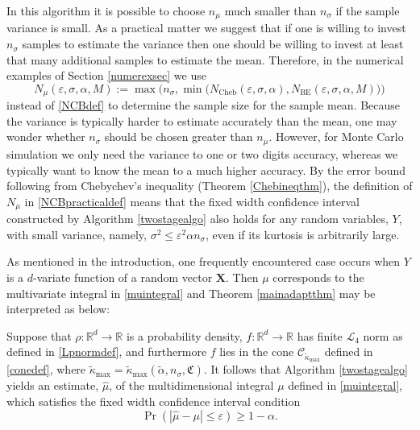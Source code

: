 \documentclass[graybox]{svmult}
\newcommand{\fudge}{\mathfrak{C}}
\newcommand\reals{\mathbb{R}}
\newcommand{\vX}{\boldsymbol{X}}
\newcommand{\tkappa}{\tilde{\kappa}}
\newcommand{\cc}{\mathcal{C}}
\newcommand{\cl}{\mathcal{L}}
\begin{document}
\begin{remark} In this algorithm it is possible to choose $n_{\mu}$ much smaller than  $n_\sigma$ if the sample variance is small.  As a practical matter we suggest that if one is willing to invest $n_\sigma$ samples to estimate the variance then one should be willing to invest at least that many additional samples to estimate the mean.  Therefore, in the numerical examples of Section \ref{numerexsec} we use
\begin{equation} \label{NCBpracticaldef}
N_{\mu}(\varepsilon,\sigma,\alpha,M) 
:= \max\bigl( n_{\sigma}, \min\bigl(N_{\text{Cheb}}(\varepsilon,\sigma,\alpha), 
N_{\text{BE}}(\varepsilon,\sigma,\alpha,M) \bigr) \bigr)
\end{equation} 
instead of \eqref{NCBdef} to determine the sample size for the sample mean.  Because the variance is typically harder to estimate accurately than the mean, one may wonder whether $n_\sigma$ should be chosen greater than $n_\mu$.  However, for Monte Carlo simulation we only need the variance to one or two digits accuracy, whereas we typically want to know the mean to a much higher accuracy.  By the error bound following from Chebychev's inequality (Theorem \ref{Chebineqthm}), the definition of $N_{\mu}$ in \eqref{NCBpracticaldef} means that the fixed width confidence interval constructed by Algorithm \ref{twostagealgo} also holds for any random variables, $Y$, with small variance, namely, $\sigma^2 \le \varepsilon^2 \alpha n_{\sigma}$, even if its kurtosis is arbitrarily large.
\end{remark}

\bigskip

As mentioned in the introduction, one frequently encountered case occurs when  $Y$ is a $d$-variate function of a random vector $\vX$. Then $\mu$ corresponds to the multivariate integral in \eqref{muintegral} and Theorem \ref{mainadaptthm} may be interpreted as below:

\begin{corollary} \label{integcor} Suppose that $\rho:\reals^d \to \reals$ is a probability density, $f: \reals^d \to \reals$ has finite $\cl_4$ norm as defined in \eqref{Lpnormdef}, and furthermore $f$ lies in the cone $\cc_{\tkappa_{\max}}$ defined in \eqref{conedef}, where $\tkappa_{\max}=\tilde\kappa_{\max}(\tilde\alpha,n_\sigma,\fudge)$.  It follows that Algorithm  \ref{twostagealgo}  yields an estimate,
$\hat\mu$, of the multidimensional integral $\mu$ defined in \eqref{muintegral}, which satisfies the fixed width confidence interval condition
$$\Pr( |\hat\mu-\mu|\le\varepsilon)\ge 1-\alpha.$$
\end{corollary}
\end{document}
